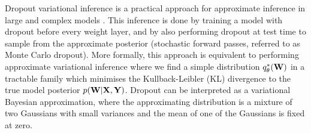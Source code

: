 Dropout variational inference is a practical approach for approximate inference in large and complex models \citep{Gal2016Bayesian}. 
This inference is done by training a model with dropout before every weight layer, and by also performing dropout at test time to sample from the approximate posterior (stochastic forward passes, referred to as Monte Carlo dropout).
More formally, this approach is equivalent to performing approximate variational inference where we find a simple distribution $q_\theta^*(\mathbf{W})$ in a tractable family which minimises the Kullback-Leibler (KL) divergence to the true model posterior $p(\mathbf{W} | \mathbf{X}, \mathbf{Y})$. 
Dropout can be interpreted as a variational Bayesian approximation, where the approximating distribution is a mixture of two Gaussians with small variances and the mean of one of the Gaussians is fixed at zero. 
%

